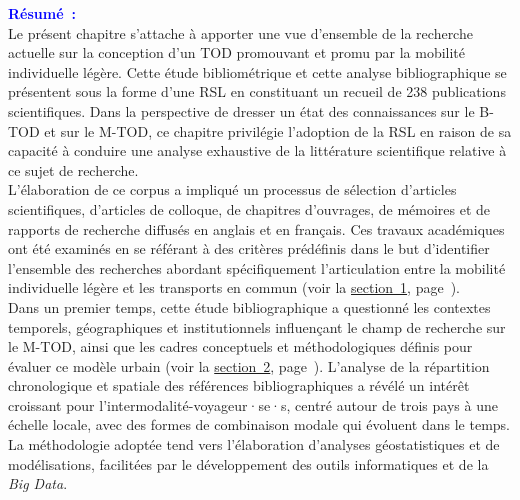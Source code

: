 \begin{refsegment}
    \newpage
    \begin{tcolorbox}[colback=white!5!white,
                      colframe=blue!75!blue,
                      title=
                      \bigskip
                      \center{\textbf{Préambule du chapitre~2}}
                      \\
                      \raggedright{\small{Chapitre composé de \pagedifference{chap2:titre}{chap3:titre} pages, dont \pagedifference{chap2:bibliographie}{chap3:titre} pages de bibliographie}}
                      \bigskip]
\Large{\textbf{\textcolor{blue}{Résumé~:}}}
    \\
    \small{
Le présent chapitre s'attache à apporter une vue d'ensemble de la recherche actuelle sur la conception d'un \acrfull{TOD} promouvant et promu par la mobilité individuelle légère. Cette étude bibliométrique et cette analyse bibliographique se présentent sous la forme d'une \acrfull{RSL} en constituant un recueil de 238 publications scientifiques. Dans la perspective de dresser un état des connaissances sur le \acrshort{B-TOD} et sur le \acrshort{M-TOD}, ce chapitre privilégie l'adoption de la \acrshort{RSL} en raison de sa capacité à conduire une analyse exhaustive de la littérature scientifique relative à ce sujet de recherche.%
    \\
L'élaboration de ce corpus a impliqué un processus de sélection d'articles scientifiques, d'articles de colloque, de chapitres d'ouvrages, de mémoires et de rapports de recherche diffusés en anglais et en français. Ces travaux académiques ont été examinés en se référant à des critères prédéfinis dans le but d'identifier l'ensemble des recherches abordant spécifiquement l'articulation entre la mobilité individuelle légère et les transports en commun (voir la \hyperref[chap2:protocole-methodologique-rsl]{section~1}, page~\pageref{chap2:protocole-methodologique-rsl}).%
    \\
Dans un premier temps, cette étude bibliographique a questionné les contextes temporels, géographiques et institutionnels influençant le champ de recherche sur le \acrshort{M-TOD}, ainsi que les cadres conceptuels et méthodologiques définis pour évaluer ce modèle urbain (voir la \hyperref[chap2:analyse-documentation-rsl]{section~2}, page~\pageref{chap2:analyse-documentation-rsl}). L'analyse de la répartition chronologique et spatiale des références bibliographiques a révélé un intérêt croissant pour l'intermodalité-voyageur·se·s, centré autour de trois pays à une échelle locale, avec des formes de combinaison modale qui évoluent dans le temps. La méthodologie adoptée tend vers l'élaboration d'analyses géostatistiques et de modélisations, facilitées par le développement des outils informatiques et de la \textsl{Big Data}.%
}
\end{tcolorbox}
\end{refsegment}
